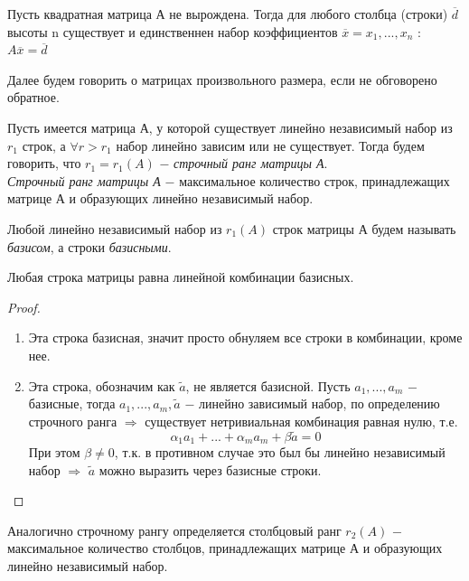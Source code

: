 \begin{theorem}
    Пусть квадратная матрица А не вырождена. Тогда для любого столбца (строки) $\overline{d}$ высоты n существует и единственнен набор коэффициентов $\overline{x} = x_1, ..., x_n$ : $A\overline{x} = \overline{d}$
\end{theorem}

Далее будем говорить о матрицах произвольного размера, если не обговорено обратное.

\begin{definition}
    Пусть имеется матрица А, у которой существует линейно независимый набор из $r_1$ строк, а $\forall r > r_1$ набор линейно зависим или не существует. Тогда будем говорить, что $r_1 = r_1(A)$ $-$ \textit{строчный ранг матрицы А}.\\

    \textit{Строчный ранг матрицы А} $-$ максимальное количество строк, принадлежащих матрице А и образующих линейно независимый набор.
    
\end{definition}

Любой линейно независимый набор из $r_1(A)$ строк матрицы А будем называть \textit{базисом}, а строки \textit{базисными}.

\begin{theorem}
    Любая строка матрицы равна линейной комбинации базисных.
\end{theorem}
\begin{proof}
    \tab\\
    \begin{enumerate}
        \item Эта строка базисная, значит просто обнуляем все строки в комбинации, кроме нее.
        \item Эта строка, обозначим как $\widetilde{a}$, не является базисной. Пусть $a_1, ..., a_m$ $-$ базисные, тогда $a_1, ..., a_m, \widetilde{a}$ $-$ линейно зависимый набор, по определению строчного ранга $\Longrightarrow$ существует нетривиальная комбинация равная нулю, т.е. 
        \[
        \alpha_1a_1 + ... + \alpha_ma_m + \beta\widetilde{a} = 0
        \]
        При этом $\beta\neq0$, т.к. в противном случае это был бы линейно независимый набор $\Longrightarrow$ $\widetilde{a}$ можно выразить через базисные строки.
    \end{enumerate}
\end{proof}

\begin{definition}
    Аналогично строчному рангу определяется столбцовый ранг $r_2(A)$ $-$ максимальное количество столбцов, принадлежащих матрице А и образующих линейно независимый набор.
\end{definition}

